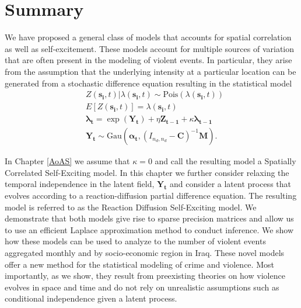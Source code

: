 \documentclass[11pt]{isuthesis}
\begin{document}
	\section{Summary}
	
	We have proposed a general class of models that accounts for spatial correlation as well as self-excitement.  These models account for multiple sources of variation that are often present in the modeling of violent events.  In particular, they arise from the assumption that the underlying intensity at a particular location can be generated from a stochastic difference equation resulting in the statistical model
	\begin{align}
	& Z(\boldsymbol{s_i},t)|\lambda(\boldsymbol{s_i},t) \sim \mbox{Pois}(\lambda(\boldsymbol{s_i},t)) \label{eq:StochDDS} \\
	& E[Z(\boldsymbol{s_i},t)]=\lambda(\boldsymbol{s_i},t)\nonumber\\
	& \boldsymbol{\lambda_t} = \exp(\boldsymbol{Y_t})+\eta \boldsymbol{Z_{t-1}}+\kappa \boldsymbol{\lambda_{t-1}}\nonumber\\
	& \boldsymbol{Y_t} \sim \mbox{Gau}\textit{} (\boldsymbol{\alpha_t},(I_{{n_d},{n_d}}-\boldsymbol{C})^{-1}\boldsymbol{M})\nonumber.
	\end{align}

	In Chapter \ref{AoAS} we assume that $\kappa=0$ and call the resulting model a Spatially Correlated Self-Exciting model.  In this chapter we further consider relaxing the temporal independence in the latent field, $\boldsymbol{Y_t}$ and consider a latent process that evolves according to a reaction-diffusion partial difference equation.  The resulting model is referred to as the Reaction Diffusion Self-Exciting model.  We demonstrate that both models give rise to sparse precision matrices and allow us to use an efficient Laplace approximation method to conduct inference.  We show how these models can be used to analyze to the number of violent events aggregated monthly and by socio-economic region in Iraq.  These novel models offer a new method for the statistical modeling of crime and violence.  Most importantly, as we show, they result from preexisting theories on how violence evolves in space and time and do not rely on unrealistic assumptions such as conditional independence given a latent process.
	
\end{document}
